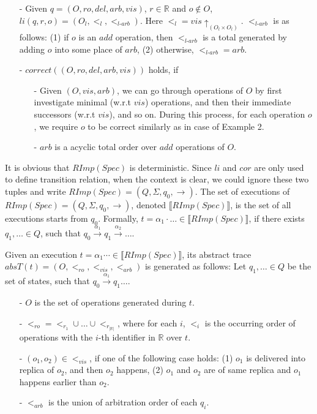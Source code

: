 \begin{itemize}
\setlength{\itemsep}{0.5pt}
\item[-] Given $q = (O,ro,del,arb,vis)$, $r \in \mathbb{R}$ and $o \notin O$, $li(q,r,o) = ( O_l ,<_l, <_{\textit{l-arb}} )$. Here $<_l = vis \uparrow_{(O_l \times O_l)}$. $<_{\textit{l-arb}}$ is as follows: (1) if $o$ is an $add$ operation, then $<_{\textit{l-arb}}$ is a total generated by adding $o$ into some place of $arb$, (2) otherwise, $<_{\textit{l-arb}} = arb$.

\item[-] $correct((O,ro,del,arb,vis))$ holds, if

    \begin{itemize}
    \setlength{\itemsep}{0.5pt}
    \item[-] Given $(O,vis,arb)$, we can go through operations of $O$ by first investigate minimal (w.r.t $vis$) operations, and then their immediate successors (w.r.t $vis$), and so on. During this process, for each operation $o$, we require $o$ to be correct similarly as in case of Example 2.

    \item[-] $arb$ is a acyclic total order over $add$ operations of $O$.
    \end{itemize}
\end{itemize}

It is obvious that $RImp(Spec)$ is deterministic. Since $li$ and $cor$ are only used to define transition relation, when the context is clear, we could ignore these two tuples and write $RImp(Spec) = (Q,\Sigma,q_0,\rightarrow)$. The set of executions of $RImp(Spec) = (Q,\Sigma,q_0,\rightarrow)$, denoted $\llbracket RImp(Spec) \rrbracket$, is the set of all executions starts from $q_0$. Formally, $t = \alpha_1 \cdot \ldots \in \llbracket RImp(Spec) \rrbracket$, if there exists $q_1,\ldots \in Q$, such that $q_0 {\xrightarrow{\alpha_1}} q_1 {\xrightarrow{\alpha_2}} \ldots$.

Given an execution $t = \alpha_1 \cdots \in \llbracket RImp(Spec) \rrbracket$, its abstract trace $absT(t) = (O,<_{\textit{ro}},<_{\textit{vis}},<_{\textit{arb}})$ is generated as follows: Let $q_1,\ldots \in Q$ be the set of states, such that $q_0 {\xrightarrow{\alpha_1}} q_1 \ldots$.

\begin{itemize}
\setlength{\itemsep}{0.5pt}
\item[-] $O$ is the set of operations generated during $t$.

\item[-] $<_{\textit{ro}} = <_{r_1} \cup \ldots \cup <_{r_{\vert \mathbb{R} \vert}}$, where for each $i$, $<_i$ is the occurring order of operations with the $i$-th identifier in $\mathbb{R}$ over $t$.

\item[-] $(o_1,o_2) \in <_{\textit{vis}}$, if one of the following case holds: (1) $o_1$ is delivered into replica of $o_2$, and then $o_2$ happens, (2) $o_1$ and $o_2$ are of same replica and $o_1$ happens earlier than $o_2$.

\item[-] $<_{\textit{arb}}$ is the union of arbitration order of each $q_i$.
\end{itemize}

